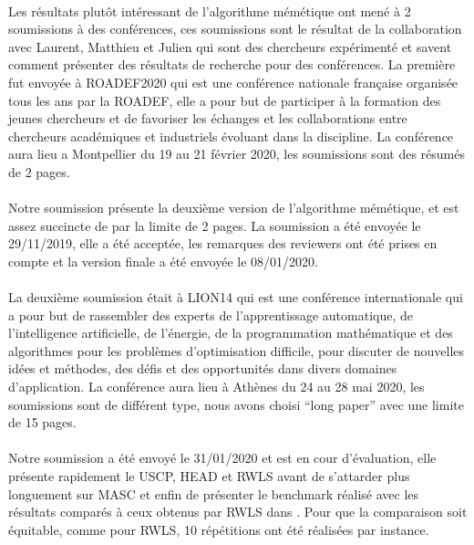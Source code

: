 \documentclass[a4paper,11pt,twoside,french,report]{../common/simplem}
\begin{document}
				\paragraph*{}
					Les résultats plutôt intéressant de l'algorithme mémétique ont mené à 2 soumissions à des conférences, ces soumissions sont le résultat de la collaboration avec Laurent, Matthieu et Julien qui sont des chercheurs expérimenté et savent comment présenter des résultats de recherche pour des conférences. La première fut envoyée à \acrshort{ROADEF2020} qui est une conférence nationale française organisée tous les ans par la \gls{ROADEF}, elle a pour but de participer à la formation des jeunes chercheurs et de favoriser les échanges et les collaborations entre chercheurs académiques et industriels évoluant dans la discipline. La conférence aura lieu a Montpellier du 19 au 21 février 2020, les soumissions sont des résumés de 2 pages.
				\paragraph*{}
					Notre soumission présente la deuxième version de l'algorithme mémétique, et est assez succincte de par la limite de 2 pages. La soumission a été envoyée le 29/11/2019, elle a été acceptée, les remarques des reviewers ont été prises en compte et la version finale a été envoyée le 08/01/2020.
				\paragraph*{}
					La deuxième soumission était à \acrshort{LION14} qui est une conférence internationale qui a pour but de rassembler des experts de l'apprentissage automatique, de l'intelligence artificielle, de l'énergie, de la programmation mathématique et des algorithmes pour les problèmes d'optimisation difficile, pour discuter de nouvelles idées et méthodes, des défis et des opportunités dans divers domaines d'application. La conférence aura lieu à Athènes du 24 au 28 mai 2020, les soumissions sont de différent type, nous avons choisi ``long paper'' avec une limite de 15 pages.
				\paragraph*{}
					Notre soumission a été envoyé le 31/01/2020 et est en cour d'évaluation, elle présente rapidement le \gls{USCP}, \gls{HEAD} et \gls{RWLS} avant de s'attarder plus longuement sur \gls{MASC} et enfin de présenter le benchmark réalisé avec les résultats comparés à ceux obtenus par \gls{RWLS} dans \cite{Gao2015}. Pour que la comparaison soit équitable, comme pour \gls{RWLS}, 10 répétitions ont été réalisées par instance.
\end{document}
